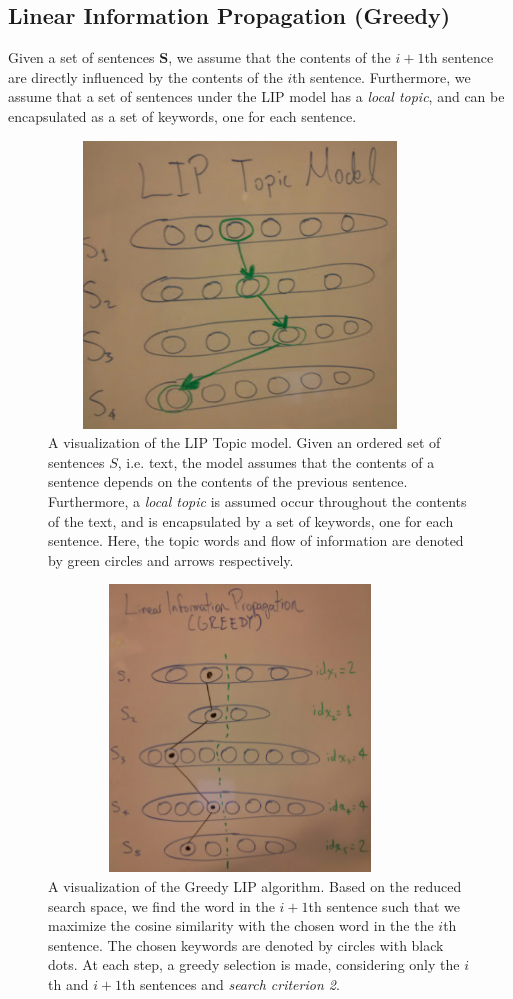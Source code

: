\documentclass[12pt]{article}
\begin{document}
\subsection{Linear Information Propagation (Greedy)}
Given a set of sentences $\bm{S}$, we assume that the contents of the $i+1$th sentence are directly influenced by the contents of the $i$th sentence. Furthermore, we assume that a set of sentences under the LIP model has a \textit{\textit{local topic}}, and can be encapsulated as a set of keywords, one for each sentence.

\begin{figure}[H]
\centering
\includegraphics[height=3in, width=4in]{Images/LIPTopic.png}
\caption{A visualization of the LIP Topic model. Given an ordered set of sentences $S$, i.e. text, the model assumes that the contents of a sentence depends on the contents of the previous sentence. Furthermore, a \textit{local topic} is assumed occur throughout the contents of the text, and is encapsulated by a set of keywords, one for each sentence. Here, the topic words and flow of information are denoted by green circles and arrows respectively.}
\end{figure}

\begin{figure}[H]
\centering
\includegraphics[height=3in, width=4in]{Images/LIPGreedy.png}
\caption{A visualization of the Greedy LIP algorithm. Based on the reduced search space, we find the word in the $i+1$th sentence such that we maximize the cosine similarity with the chosen word in the the $i$th sentence. The chosen keywords are denoted by circles with black dots. At each step, a greedy selection is made, considering only the $i$th and $i+1$th sentences and \textit{search criterion 2}.}
\end{figure}
\end{document}
